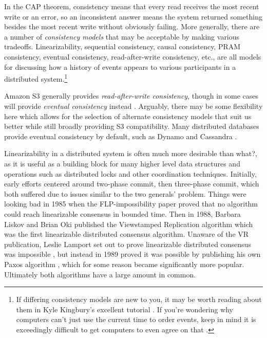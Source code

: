 \documentclass[a4paper,10pt]{article} \usepackage[utf8]{inputenc}
\newcommand{\bs}[1]{{\color{red}#1}}
\begin{document}
In the CAP theorem, consistency means that every read receives the most recent
write or an error, so an inconsistent answer means the system returned something
besides the most recent write without obviously failing. More generally, there
are a number of {\em consistency models} that may be acceptable by making
various tradeoffs. Linearizability, sequential consistency, causal consistency,
PRAM consistency, eventual consistency, read-after-write consistency, etc., are
all models for discussing how a history of events appears to various
participants in a distributed system.\footnote{If differing consistency models
are new to you, it may be worth reading about them in Kyle Kingbury's excellent
tutorial \cite{aphyr-consistency}. If you're wondering why computers can't just
use the current time to order events, keep in mind it is exceedingly difficult
to get computers to even agree on that \cite{no-now}.}

Amazon S3 generally provides {\em read-after-write consistency}, though in some
cases will provide {\em eventual consistency} instead \cite{s3-consistency}.
Arguably, there may be some flexibility here which allows for the selection
of alternate consistency models that suit us better while still broadly
providing S3 compatibility.
Many distributed databases provide eventual consistency by
default, such as Dynamo \cite{dynamo} and Cassandra \cite{cassandra}.

Linearizability in a distributed system is often much more desirable
\bs{than what?}, as it is
useful as a building block for many higher level data structures and operations
such as distributed locks and other coordination techniques. Initially, early
efforts centered around two-phase commit, then three-phase commit, which both
suffered due to issues similar to the two generals' problem. Things were looking
bad in 1985 when the FLP-impossibility paper \cite{flp} proved that no algorithm
could reach linearizable consensus in bounded time. Then in 1988, Barbara Liskov
and Brian Oki published the Viewstamped Replication algorithm \cite{vr} which
was the first linearizable distributed consensus algorithm. Unaware of the VR
publication, Leslie Lamport set out to prove linearizable distributed consensus
was impossible \cite{paxos-note}, but instead in 1989 proved it was possible by
publishing his own Paxos algorithm \cite{paxos}, which for some reason became
significantly more popular. Ultimately both algorithms have a large amount in
common.
\end{document}
